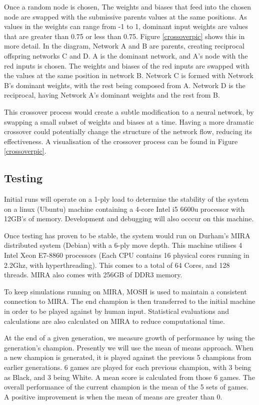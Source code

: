 \documentclass[12pt,a4paper]{article}
\begin{document}
            Once a random node is chosen, The weights and biases that feed into the chosen node are swapped with the submissive parents values at the same positions. As values in the weights can range from -1 to 1, dominant input weights are values that are greater than 0.75 or less than 0.75. 
            Figure \ref{crossoverpic} shows this in more detail. In the diagram, Network A and B are parents, creating reciprocal offspring networks C and D. A is the dominant network, and A's node with the red inputs is chosen. The weights and biases of the red inputs are swapped with the values at the same position in network B. Network C is formed with Network B's dominant weights, with the rest being composed from A. Network D is the reciprocal, having Network A's dominant weights and the rest from B.

            This crossover process would create a subtle modification to a neural network, by swapping a small subset of weights and biases at a time. Having a more dramatic crossover could potentially change the structure of the network flow, reducing its effectiveness. A visualisation of the crossover process can be found in Figure \ref{crossoverpic}.
            

    \subsection{Testing}
        Initial runs will operate on a 1-ply load to determine the stability of the system on a linux (Ubuntu) machine containing a 4-core Intel i5 6600u processor with 12GB's of memory. Development and debugging will also occcur on this machine. 
        
        Once testing has proven to be stable, the system would run on Durham's MIRA distributed system (Debian) with a 6-ply move depth. This machine utilises 4 Intel Xeon E7-8860 processors (Each CPU contains 16 physical cores running in 2.2Ghz, with hyperthreading). This comes to a total of 64 Cores, and 128 threads. MIRA also comes with 256GB of DDR3 memory. 
        
        To keep simulations running on MIRA, MOSH is used to maintain a consistent connection to MIRA. The end champion is then transferred to the initial machine in order to be played against by human input. Statistical evaluations and calculations are also calculated on MIRA to reduce computational time.

        At the end of a given generation, we measure growth of performance by using the generation's champion. Presently we will use the mean of means approach. When a new champion is generated, it is played against the previous 5 champions from earlier generations. 6 games are played for each previous champion, with 3 being as Black, and 3 being White. A mean score is calculated from those 6 games. The overall performance of the current champion is the mean of the 5 sets of games. A positive improvement is when the mean of means are greater than 0. 
\end{document}

